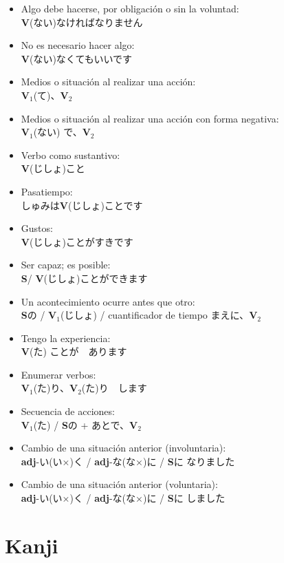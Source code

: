 \documentclass[a4paper,12pt,oneside]{report}
\def\bv{\textbf{V}} %
\def\bs{\textbf{S}} %
\def\adj{\textbf{adj}} %
\def\vi{$\mathrm{\bv}_1$} %
\def\vn{$\mathrm{\bv}_2$} %
\begin{document}
\begin{CJK*}{UTF8}{min}
\begin{itemize}
          \bv(ない)でください
    \item Algo debe hacerse, por obligación o sin la voluntad:\\
          \bv(ない)なければなりません
    \item No es necesario hacer algo:\\
          \bv(ない)なくてもいいです
    \item Medios o situación al realizar una acción:\\
          \vi(て)、\vn
    \item Medios o situación al realizar una acción con forma negativa:\\
          \vi(ない) で、\vn
    \item Verbo como sustantivo:\\
          \bv(じしょ)こと
    \item Pasatiempo:\\
          しゅみは\bv(じしょ)ことです
    \item Gustos:\\
          \bv(じしょ)ことがすきです
    \item Ser capaz; es posible:\\
          \bs / \bv(じしょ)ことができます
    \item Un acontecimiento ocurre antes que otro:\\
          \bs{の} / \vi(じしょ) / cuantificador de tiempo まえに、\vn
    \item Tengo la experiencia:\\
          \bv(た) ことが　あります
    \item Enumerar verbos:\\
          \vi(た)り、\vn(た)り　します
    \item Secuencia de acciones:\\
          \vi(た) / \bs {の} + あとで、\vn
    \item Cambio de una situaci\'on anterior (involuntaria):\\
          \adj-い(い×){く} / \adj-な(な×){に} / \bs{に} なりました
    \item Cambio de una situaci\'on anterior (voluntaria):\\
          \adj-い(い×){く} / \adj-な(な×){に} / \bs{に} しました
  \end{itemize}


\chapter{Kanji}
  \thispagestyle{contenido} %
  \pagestyle{contenido}     %


\end{CJK*}
\end{document}
